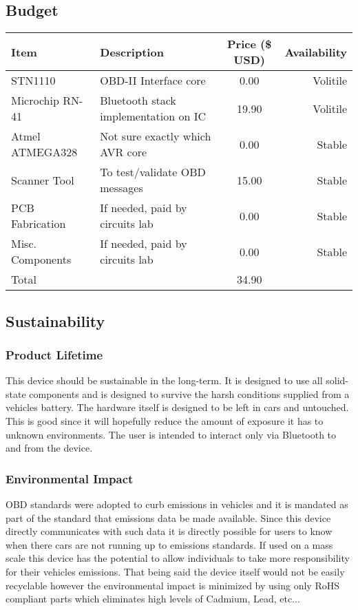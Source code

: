 \documentclass[12pt,letterpaper]{article}
\begin{document}
\subsection{Budget}
\begin{tabular}{| l | p{7cm} | c | r |}
\hline
Item & Description & Price (\$ USD) & Availability \\ \hline
STN1110 & OBD-II Interface core & 0.00& Volitile \\ \hline
Microchip RN-41 & Bluetooth stack implementation on IC & 19.90 & Volitile \\ \hline
Atmel ATMEGA328 & Not sure exactly which AVR core & 0.00 & Stable \\ \hline
Scanner Tool & To test/validate OBD messages & 15.00 & Stable\\ \hline
PCB Fabrication & If needed, paid by circuits lab & 0.00 & Stable\\ \hline
Misc. Components & If needed, paid by circuits lab & 0.00 & Stable\\ \hline
\hline
Total && 34.90 & \\ \hline
\end{tabular}

\subsection{Sustainability}
\subsubsection{Product Lifetime}
This device should be sustainable in the long-term. It is designed to use all solid-state components and is designed to survive the harsh conditions supplied from a vehicles battery. The hardware itself is designed to be left in cars and untouched. This is good since it will hopefully reduce the amount of exposure it has to unknown environments. The user is intended to interact only via Bluetooth to and from the device. 

\subsubsection{Environmental Impact}
OBD standards were adopted to curb emissions in vehicles and it is mandated as part of the standard that emissions data be made available. Since this device directly communicates with such data it is directly possible for users to know when there cars are not running up to emissions standards. If used on a mass scale this device has the potential to allow individuals to take more responsibility for their vehicles emissions. That being said the device itself would not be easily recyclable however the environmental impact is minimized by using only RoHS compliant parts which eliminates high levels of Cadmium, Lead, etc...
\end{document}
